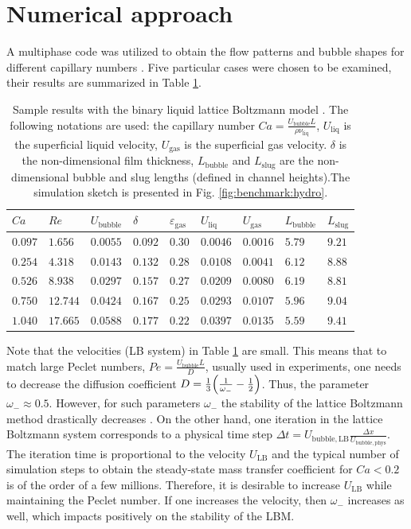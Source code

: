 \documentclass{article}
\newcommand{\lbubble}{L_{\mathrm{bubble}}}
\newcommand{\lslug}{L_{\mathrm{slug}}}
\newcommand{\ububble}{U_{\mathrm{bubble}}}
\newcommand{\uliq}{U_{\mathrm{liq}}}
\newcommand{\ugas}{U_{\mathrm{gas}}}
\newcommand{\omegaminus}{\omega_{-}}
\newcommand{\holdup}{\varepsilon_{\mathrm{gas}}}
\begin{document}
\section{Numerical approach}
\label{sec:numerics}
A multiphase code was utilized to obtain the flow patterns and bubble shapes for different capillary numbers
\cite{kuzmin-binary2d}. Five particular cases were chosen to be examined, their results are summarized
in Table \ref{table:capillary:cases}. 
\begin{table}[htb!]
\begin{tabularx}{\textwidth}{|X|X|X|X|X|X|X|X|X|}
\hline
$Ca$    &$Re$     &$\ububble$ &$\delta$&$\holdup$
&$\uliq$&$\ugas$&$\lbubble$&$\lslug$\\
\hline
$0.097$ &$1.656$  &$0.0055$ &$0.092$ &$0.30$ &$0.0046$&$0.0016$&$5.79$&$9.21$\\ 
$0.254$ &$4.318$  &$0.0143$ &$0.132$ &$0.28$ &$0.0108$&$0.0041$&$6.12$&$8.88$\\ 
$0.526$ &$8.938$  &$0.0297$ &$0.157$ &$0.27$ &$0.0209$&$0.0080$&$6.19$&$8.81$\\
$0.750$ &$12.744$ &$0.0424$ &$0.167$ &$0.25$ &$0.0293$&$0.0107$&$5.96$&$9.04$\\
$1.040$ &$17.665$ &$0.0588$ &$0.177$ &$0.22$ &$0.0397$&$0.0135$&$5.59$&$9.41$\\
\hline
\end{tabularx}
\caption{Sample results with the binary liquid lattice Boltzmann model \cite{kuzmin-binary2d}. The
following notations are used: the capillary number $Ca=\frac{\ububble L}{\rho \nu_{\mathrm{liq}}}$, $\uliq$ is the superficial liquid velocity, $\ugas$ is the
superficial gas velocity. $\delta$ is the
non-dimensional film thickness, $\lbubble$ and $\lslug$ are the non-dimensional bubble and slug lengths (defined in channel heights).The simulation sketch is presented in Fig.
\ref{fig:benchmark:hydro}. \label{table:capillary:cases}}
\end{table}
Note that the velocities (LB system) in Table \ref{table:capillary:cases} are small. This means that to
match large Peclet numbers, $Pe=\frac{\ububble L}{D}$, usually used in experiments, one needs to decrease the diffusion coefficient
$D=\frac{1}{3}\Bigl(\frac{1}{\omegaminus}-\frac{1}{2}\Bigr)$. Thus, the parameter $\omegaminus\approx 0.5$. However, for such parameters
$\omegaminus$ the stability of the lattice Boltzmann method drastically decreases
\cite{kuzmin-d1q3}. On the other hand, one iteration in the lattice Boltzmann system corresponds
to a physical time step  $\Delta t=U_{\mathrm{bubble,LB}} \frac{\Delta
x}{U_{\mathrm{bubble,phys}}}$. The iteration time is proportional to the velocity $U_{\mathrm{LB}}$
and the typical number of simulation steps to obtain the steady-state mass transfer coefficient for
$Ca<0.2$ is of the order of a few millions. Therefore, it is desirable to increase    $U_{\mathrm{LB}}$
while maintaining the Peclet number. If one increases the velocity, then
$\omegaminus$ increases as well, which impacts positively on the stability of the LBM.
 
\end{document}
